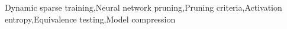 \documentclass[a4paper]{cas-sc}
\begin{document}
\begin{keywords}
 Dynamic sparse training\sep Neural network pruning\sep Pruning criteria\sep Activation entropy\sep Equivalence testing\sep Model compression
\end{keywords}



\maketitle







\printcredits

%





\end{document}
